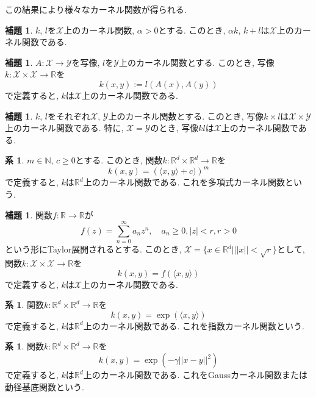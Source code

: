 \documentclass[uplatex]{jsarticle}
\theoremstyle{definition}
\newtheorem{corollary}[definition]{系}
\newtheorem{lemma}[definition]{補題}
\numberwithin{equation}{section}
\newcommand{\N}{\mathbb{N}}
\newcommand{\R}{\mathbb{R}}
\newcommand{\norm}[1]{\left|\left|#1\right|\right|}
\begin{document}
この結果により様々なカーネル関数が得られる.
\begin{lemma}
    $k$, $l$を$\mathcal{X}$上のカーネル関数, $\alpha > 0$とする.
    このとき, $\alpha k$, $k + l$は$\mathcal{X}$上のカーネル関数である.
\end{lemma}
\begin{lemma}
    $A \colon \mathcal{X} \to \mathcal{Y}$を写像, $l$を$\mathcal{Y}$上のカーネル関数とする.
    このとき, 写像$k \colon \mathcal{X} \times \mathcal{X} \to \R$を
    \begin{equation}
        k(x, y) := l(A(x), A(y))
    \end{equation}
    で定義すると, $k$は$\mathcal{X}$上のカーネル関数である.
\end{lemma}
\begin{lemma}
    $k$, $l$をそれぞれ$\mathcal{X}$, $\mathcal{Y}$上のカーネル関数とする.
    このとき, 写像$k \times l$は$\mathcal{X} \times \mathcal{Y}$上のカーネル関数である.
    特に, $\mathcal{X} = \mathcal{Y}$のとき, 写像$kl$は$\mathcal{X}$上のカーネル関数である.
\end{lemma}
\begin{corollary}
    $m \in \N$, $c \geq 0$とする.
    このとき, 関数$k \colon \R^{d} \times \R^{d} \to \R$を
    \begin{equation}
        k(x, y) = \left(\langle x, y\rangle + c)\right)^{m}
    \end{equation}
    で定義すると, $k$は$\R^{d}$上のカーネル関数である.
    これを多項式カーネル関数という.
\end{corollary}
\begin{lemma}
    関数$f \colon \R \to \R$が
    \begin{equation}
        f(z) = \sum_{n = 0}^{\infty} a_{n}z^{n}, \quad a_{n} \geq 0, |z| < r, r > 0
    \end{equation}
    という形にTaylor展開されるとする.
    このとき, $\mathcal{X} = \{x \in \R^{d} | \norm{x} < \sqrt{r}\}$として, 関数$k \colon \mathcal{X} \times \mathcal{X} \to \R$を
    \begin{equation}
        k(x, y) = f(\langle x, y \rangle)
    \end{equation}
    で定義すると, $k$は$\mathcal{X}$上のカーネル関数である.
\end{lemma}
\begin{corollary}
    関数$k \colon \R^{d} \times \R^{d} \to \R$を
    \begin{equation}
        k(x, y) = \exp\left(\langle x, y\rangle\right)
    \end{equation}
    で定義すると, $k$は$\R^{d}$上のカーネル関数である.
    これを指数カーネル関数という.
\end{corollary}
\begin{corollary}
    関数$k \colon \R^{d} \times \R^{d} \to \R$を
    \begin{equation}
        k(x, y) = \exp\left(-\gamma\norm{x - y}^{2}\right)
    \end{equation}
    で定義すると, $k$は$\R^{d}$上のカーネル関数である.
    これをGaussカーネル関数または動径基底関数という.
\end{corollary}
\end{document}
